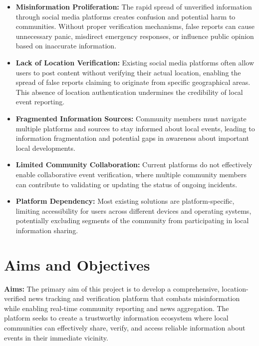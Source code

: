 \begin{itemize}
    \item \textbf{Misinformation Proliferation:} The rapid spread of unverified information through social media platforms creates confusion and potential harm to communities. Without proper verification mechanisms, false reports can cause unnecessary panic, misdirect emergency responses, or influence public opinion based on inaccurate information.
    
    \item \textbf{Lack of Location Verification:} Existing social media platforms often allow users to post content without verifying their actual location, enabling the spread of false reports claiming to originate from specific geographical areas. This absence of location authentication undermines the credibility of local event reporting.
    
    \item \textbf{Fragmented Information Sources:} Community members must navigate multiple platforms and sources to stay informed about local events, leading to information fragmentation and potential gaps in awareness about important local developments.
    
    \item \textbf{Limited Community Collaboration:} Current platforms do not effectively enable collaborative event verification, where multiple community members can contribute to validating or updating the status of ongoing incidents.
    
    \item \textbf{Platform Dependency:} Most existing solutions are platform-specific, limiting accessibility for users across different devices and operating systems, potentially excluding segments of the community from participating in local information sharing.
\end{itemize}

\section{Aims and Objectives}
\label{sec:intro_aims_obj}

\textbf{Aims:} The primary aim of this project is to develop a comprehensive, location-verified news tracking and verification platform that combats misinformation while enabling real-time community reporting and news aggregation. The platform seeks to create a trustworthy information ecosystem where local communities can effectively share, verify, and access reliable information about events in their immediate vicinity.

